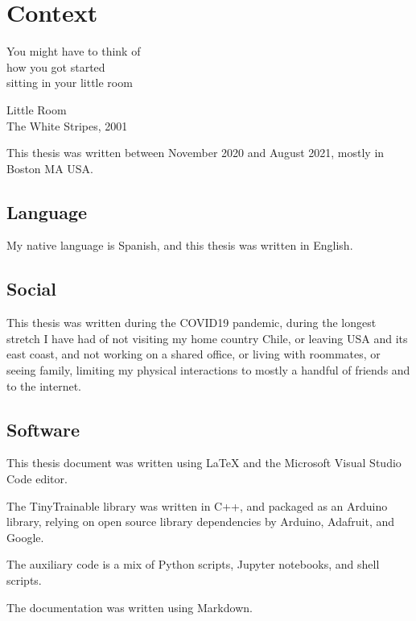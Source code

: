 \chapter{Context}


\epigraph{You might have to think  of \\ how you got started \\ sitting in your little room}{Little Room \\ The White Stripes, 2001}

This thesis was written between November 2020 and August 2021, mostly in Boston MA USA.

\section{Language}

My native language is Spanish, and this thesis was written in English.

\section{Social}

This thesis was written during the COVID19 pandemic, during the longest stretch I have had of not visiting my home country Chile, or leaving USA and its east coast, and not working on a shared office, or living with roommates, or seeing family, limiting my physical interactions to mostly a handful of friends and to the internet.

\section{Software}

This thesis document was written using LaTeX and the Microsoft Visual Studio Code editor.

The TinyTrainable library was written in C++, and packaged as an Arduino library, relying on open source library dependencies by Arduino, Adafruit, and Google.

The auxiliary code is a mix of Python scripts, Jupyter notebooks, and shell scripts.

The documentation was written using Markdown.


